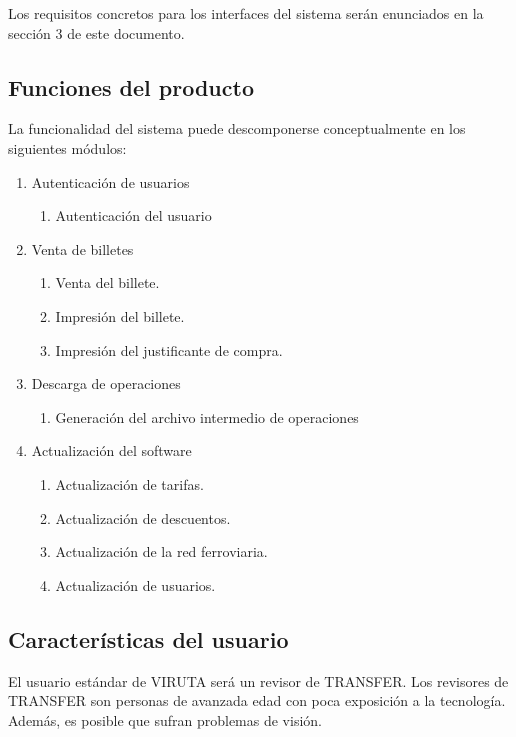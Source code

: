 Los requisitos concretos para los interfaces del sistema serán enunciados en la sección 3 de este documento.

\subsection{Funciones del producto}

La funcionalidad del sistema puede descomponerse conceptualmente en los siguientes módulos:

\begin{enumerate}
\item Autenticación de usuarios
	\begin{enumerate}
	\item Autenticación del usuario
	\end{enumerate}
\item Venta de billetes
	\begin{enumerate}
	\item Venta del billete.
	\item Impresión del billete.
	\item Impresión del justificante de compra.
	\end{enumerate}
\item Descarga de operaciones
	\begin{enumerate}
	\item Generación del archivo intermedio de operaciones
	\end{enumerate}
\item Actualización del software
	\begin{enumerate}
	\item Actualización de tarifas.
	\item Actualización de descuentos.
	\item Actualización de la red ferroviaria.
	\item Actualización de usuarios.
	\end{enumerate}
\end{enumerate}

\subsection{Características del usuario}

El usuario estándar de VIRUTA será un revisor de TRANSFER. Los revisores de TRANSFER son personas de avanzada edad con poca exposición a la tecnología. Además, es posible que sufran problemas de visión.

